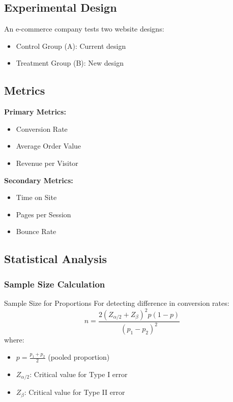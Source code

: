 \documentclass[12pt,a4paper]{book}
\begin{document}
{{\subsection{Experimental Design}

An e-commerce company tests two website designs:
\begin{itemize}
    \item Control Group (A): Current design
    \item Treatment Group (B): New design
\end{itemize}

\subsection{Metrics}

\textbf{Primary Metrics:}
\begin{itemize}
    \item Conversion Rate
    \item Average Order Value
    \item Revenue per Visitor
\end{itemize}

\textbf{Secondary Metrics:}
\begin{itemize}
    \item Time on Site
    \item Pages per Session
    \item Bounce Rate
\end{itemize}

\subsection{Statistical Analysis}

\subsubsection{Sample Size Calculation}

\begin{definition}{Sample Size for Proportions}
For detecting difference in conversion rates:
\[
n = \frac{2(Z_{\alpha/2} + Z_\beta)^2 p(1-p)}{(p_1 - p_2)^2}
\]
where:
\begin{itemize}
    \item $p = \frac{p_1 + p_2}{2}$ (pooled proportion)
    \item $Z_{\alpha/2}$: Critical value for Type I error
    \item $Z_\beta$: Critical value for Type II error
\end{itemize}
\end{definition}

}}
\end{document}
